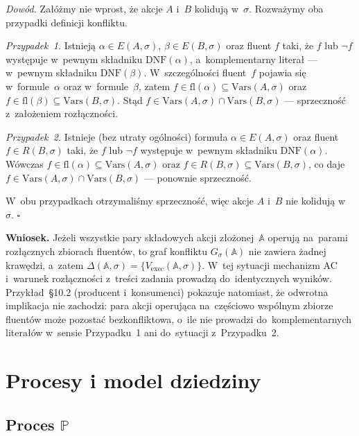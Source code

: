 \documentclass[11pt,a4paper]{article}
\newcommand{\DNF}{\mathrm{DNF}}
\theoremstyle{definition}
\begin{document}
\medskip
\noindent \textit{Dowód.}
Załóżmy nie wprost, że akcje $A$ i~$B$ kolidują w~$\sigma$. Rozważymy
oba przypadki definicji konfliktu.

\emph{Przypadek~1.} Istnieją $\alpha \in E(A,\sigma)$, $\beta \in E(B,\sigma)$
oraz fluent $f$ taki, że $f$ lub $\neg f$ występuje w~pewnym składniku
$\DNF(\alpha)$, a~komplementarny literał --- w~pewnym składniku
$\DNF(\beta)$. W~szczególności fluent~$f$ pojawia się w~formule~$\alpha$
oraz w~formule~$\beta$, zatem $f \in \mathrm{fl}(\alpha) \subseteq
\mathrm{Vars}(A,\sigma)$ oraz $f \in \mathrm{fl}(\beta) \subseteq
\mathrm{Vars}(B,\sigma)$. Stąd $f \in \mathrm{Vars}(A,\sigma) \cap
\mathrm{Vars}(B,\sigma)$ --- sprzeczność z~założeniem rozłączności.

\emph{Przypadek~2.} Istnieje (bez utraty ogólności) formuła
$\alpha \in E(A,\sigma)$ oraz fluent $f \in R(B,\sigma)$ taki, że
$f$ lub $\neg f$ występuje w~pewnym składniku $\DNF(\alpha)$.
Wówczas $f \in \mathrm{fl}(\alpha) \subseteq \mathrm{Vars}(A,\sigma)$
oraz $f \in R(B,\sigma) \subseteq \mathrm{Vars}(B,\sigma)$, co daje
$f \in \mathrm{Vars}(A,\sigma) \cap \mathrm{Vars}(B,\sigma)$ ---
ponownie sprzeczność.

\noindent W~obu przypadkach otrzymaliśmy sprzeczność, więc akcje $A$
i~$B$ nie kolidują w~$\sigma$. \hfill$\square$

\medskip
\noindent \textbf{Wniosek.}
Jeżeli wszystkie pary składowych akcji złożonej~$\mathbb{A}$ operują
na~parami rozłącznych zbiorach fluentów, to graf konfliktu
$G_\sigma(\mathbb{A})$ nie zawiera żadnej krawędzi, a~zatem
$\Delta(\mathbb{A},\sigma) = \{V_{\mathrm{exec}}(\mathbb{A},\sigma)\}$.
W~tej sytuacji mechanizm AC i~warunek rozłączności z~treści zadania
prowadzą do~identycznych wyników. Przykład~\S10.2 (producent i~konsumenci)
pokazuje natomiast, że odwrotna implikacja nie zachodzi: para akcji
operująca na~częściowo wspólnym zbiorze fluentów może pozostać
bezkonfliktowa, o~ile nie prowadzi do~komplementarnych literałów
w~sensie Przypadku~1 ani do~sytuacji z~Przypadku~2.

\section{Procesy i model dziedziny}

\subsection{Proces \texorpdfstring{$\mathbb{P}$}{P}}
\end{document}
